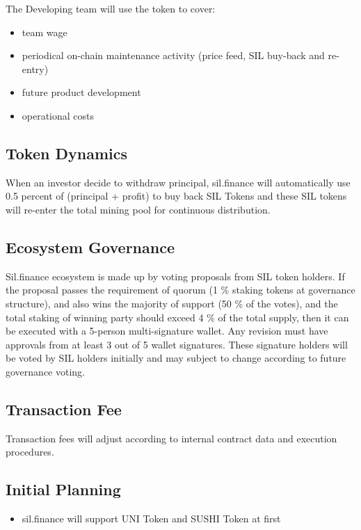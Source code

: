 \documentclass[11pt,letterpaper]{article}
\begin{document}
\begin{multicols}{2}
The Developing team will use the token to cover:
\begin{itemize}
    \item team wage
    \item periodical on-chain maintenance activity (price feed, SIL buy-back and re-entry)
    \item future product development
    \item operational costs
\end{itemize}

\subsection{Token Dynamics}
When an investor decide to withdraw principal, sil.finance will automatically use 0.5 percent of (principal + profit) to buy back SIL Tokens and these SIL tokens will re-enter the total mining pool for continuous distribution.

\subsection{Ecosystem Governance}
Sil.finance ecosystem is made up by voting  proposals from SIL token holders. If the proposal passes the requirement of quorum (1 \% staking tokens at governance structure), and also wins the majority of support (50 \% of the votes), and the total staking of winning party should exceed 4 \% of the total supply, then it can be executed with a 5-person multi-signature wallet. Any revision must have approvals from at least 3 out of 5 wallet signatures. These signature holders will be voted by SIL holders initially and may subject to change according to future governance voting.

\subsection{Transaction Fee}
Transaction fees will adjust according to internal contract data and execution procedures.

\subsection{Initial Planning}
\begin{itemize}
  \item sil.finance will support UNI Token and SUSHI Token at first
\end{itemize}


\end{multicols}
\end{document}
